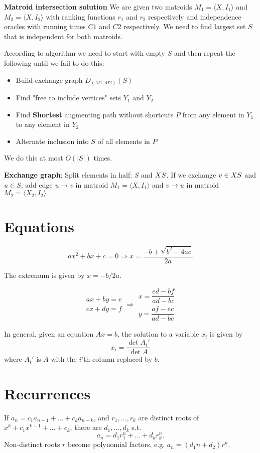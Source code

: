 \documentclass[11pt]{article}
\begin{document}
\begin{multicols}{3}
\begin{itemize}
\textbf{Matroid intersection solution}
We are given two matroids $M_1=⟨X,I_1⟩$ and $M_2=⟨X,I_2⟩$ with ranking functions $r_1$ and $r_2$ respectively and independence oracles with running times $C1$ and $C2$ respectively. We need to find largest set $S$ that is independent for both matroids.

According to algorithm we need to start with empty $S$ and then repeat the following until we fail to do this:

\begin{itemize}
    \item Build exchange graph $D_{(M1,M2)}(S)$
    \item Find "free to include vertices" sets $Y_1$ and $Y_2$
    \item Find \textbf{Shortest} augmenting path without shortcuts $P$ from any element in $Y_1$ to any element in $Y_2$
    \item Alternate inclusion into $S$ of all elements in $P$
\end{itemize}

We do this at most $O(|S|)$ times.

\textbf{Exchange graph}: Split elements in half: $S$ and $X \\ S$. If we exchange $v \in X \\ S$ and $u \in S$, add edge $u\rightarrow v$ in matroid $M_1=⟨X,I_1⟩$ and $v\rightarrow u$ in matroid $M_2=⟨X_2,I_2⟩$

\end{itemize}

\section{Equations}
\[ax^2+bx+c=0 \Rightarrow x = \frac{-b\pm\sqrt{b^2-4ac}}{2a}\]

The extremum is given by $x = -b/2a$.

\[\begin{aligned}ax+by=e\\cx+dy=f\end{aligned}
\Rightarrow
\begin{aligned}x=\dfrac{ed-bf}{ad-bc}\\y=\dfrac{af-ec}{ad-bc}\end{aligned}\]

In general, given an equation $Ax = b$, the solution to a variable $x_i$ is given by
\[x_i = \frac{\det A_i'}{\det A} \]
where $A_i'$ is $A$ with the $i$'th column replaced by $b$.

\section{Recurrences}
If $a_n = c_1 a_{n-1} + \dots + c_k a_{n-k}$, and $r_1, \dots, r_k$ are distinct roots of $x^k + c_1 x^{k-1} + \dots + c_k$, there are $d_1, \dots, d_k$ s.t.
\[a_n = d_1r_1^n + \dots + d_kr_k^n. \]
Non-distinct roots $r$ become polynomial factors, e.g. $a_n = (d_1n + d_2)r^n$.


\end{multicols}
\end{document}
